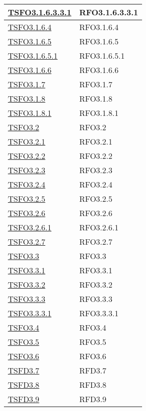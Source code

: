 \begin{longtable}{|>{\centering}m{5cm}|m{5cm}<{\centering}|}
\hyperlink{TSFO3.1.6.3.3.1}{TSFO3.1.6.3.3.1} & RFO3.1.6.3.3.1\\ \hline
\hyperlink{TSFO3.1.6.4}{TSFO3.1.6.4} & RFO3.1.6.4\\ \hline
\hyperlink{TSFO3.1.6.5}{TSFO3.1.6.5} & RFO3.1.6.5\\ \hline
\hyperlink{TSFO3.1.6.5.1}{TSFO3.1.6.5.1} & RFO3.1.6.5.1\\ \hline
\hyperlink{TSFO3.1.6.6}{TSFO3.1.6.6} & RFO3.1.6.6\\ \hline
\hyperlink{TSFO3.1.7}{TSFO3.1.7} & RFO3.1.7\\ \hline
\hyperlink{TSFO3.1.8}{TSFO3.1.8} & RFO3.1.8\\ \hline
\hyperlink{TSFO3.1.8.1}{TSFO3.1.8.1} & RFO3.1.8.1\\ \hline
\hyperlink{TSFO3.2}{TSFO3.2} & RFO3.2\\ \hline
\hyperlink{TSFO3.2.1}{TSFO3.2.1} & RFO3.2.1\\ \hline
\hyperlink{TSFO3.2.2}{TSFO3.2.2} & RFO3.2.2\\ \hline
\hyperlink{TSFO3.2.3}{TSFO3.2.3} & RFO3.2.3\\ \hline
\hyperlink{TSFO3.2.4}{TSFO3.2.4} & RFO3.2.4\\ \hline
\hyperlink{TSFO3.2.5}{TSFO3.2.5} & RFO3.2.5\\ \hline
\hyperlink{TSFO3.2.6}{TSFO3.2.6} & RFO3.2.6\\ \hline
\hyperlink{TSFO3.2.6.1}{TSFO3.2.6.1} & RFO3.2.6.1\\ \hline
\hyperlink{TSFO3.2.7}{TSFO3.2.7} & RFO3.2.7\\ \hline
\hyperlink{TSFO3.3}{TSFO3.3} & RFO3.3\\ \hline
\hyperlink{TSFO3.3.1}{TSFO3.3.1} & RFO3.3.1\\ \hline
\hyperlink{TSFO3.3.2}{TSFO3.3.2} & RFO3.3.2\\ \hline
\hyperlink{TSFO3.3.3}{TSFO3.3.3} & RFO3.3.3\\ \hline
\hyperlink{TSFO3.3.3.1}{TSFO3.3.3.1} & RFO3.3.3.1\\ \hline
\hyperlink{TSFO3.4}{TSFO3.4} & RFO3.4\\ \hline
\hyperlink{TSFO3.5}{TSFO3.5} & RFO3.5\\ \hline
\hyperlink{TSFO3.6}{TSFO3.6} & RFO3.6\\ \hline
\hyperlink{TSFD3.7}{TSFD3.7} & RFD3.7\\ \hline
\hyperlink{TSFD3.8}{TSFD3.8} & RFD3.8\\ \hline
\hyperlink{TSFD3.9}{TSFD3.9} & RFD3.9\\ \hline

\end{longtable}
